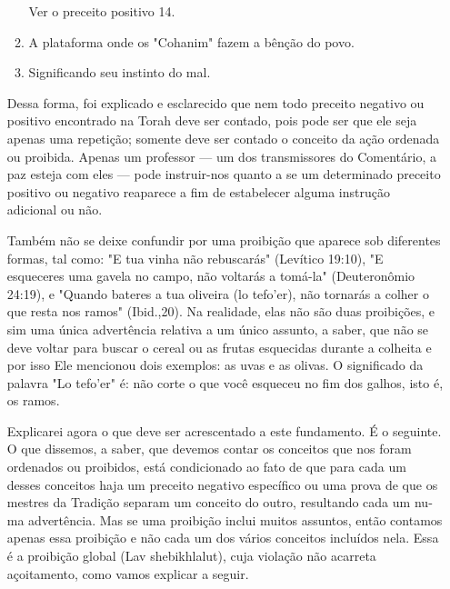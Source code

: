\begin{itemize}
\begin{enumrate}
\begin{enumerate}
 Ver o preceito positivo 14.
 
\item
 
 A plataforma onde os "Cohanim" fazem a bênção do povo.
 
\item
 
 Significando seu instinto do mal.
 
\end{enumerate}



Dessa forma, foi explicado e esclarecido que nem todo preceito ne­gativo
ou positivo encontrado na Torah deve ser contado, pois pode ser que ele
seja apenas uma repetição; somente deve ser contado o conceito da ação
ordenada ou proibida. Apenas um professor --- um dos transmissores do
Co­mentário, a paz esteja com eles --- pode instruir-nos quanto a se um
determina­do preceito positivo ou negativo reaparece a fim de
estabelecer alguma instru­ção adicional ou não.

Também não se deixe confundir por uma proibição que aparece sob
diferentes formas, tal como: "E tua vinha não rebuscarás" (Levítico
19:10), "E esqueceres uma gavela no campo, não voltarás a tomá-la"
(Deuteronômio 24:19), e "Quando bateres a tua oliveira (lo tefo'er), não
tornarás a colher o que resta nos ramos" (Ibid.,20). Na realidade, elas
não são duas proibições, e sim uma única advertência relativa a um único
assunto, a saber, que não se deve voltar para buscar o cereal ou as
frutas esquecidas durante a colheita e por isso Ele mencionou dois
exemplos: as uvas e as olivas. O significado da palavra "Lo te­fo'er" é:
não corte o que você esqueceu no fim dos galhos, isto é, os ramos.

Explicarei agora o que deve ser acrescentado a este fundamento. É o
seguinte. O que dissemos, a saber, que devemos contar os conceitos que
nos foram ordenados ou proibidos, está condicionado ao fato de que para
cada um desses conceitos haja um preceito negativo específico ou uma
prova de que os mestres da Tradição separam um conceito do outro,
resultando cada um nu­ma advertência. Mas se uma proibição inclui muitos
assuntos, então contamos apenas essa proibição e não cada um dos vários
conceitos incluídos nela. Essa é a proibição global (Lav shebikhlalut),
cuja violação não acarreta açoitamento, como vamos explicar a seguir.


\end{enumrate}
\end{itemize}
